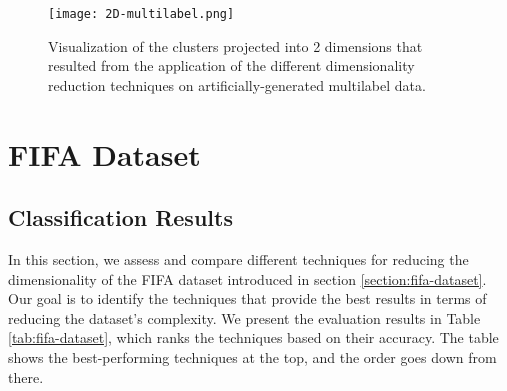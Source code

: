 \begin{figure}
    \centering
    \texttt{[image: 2D-multilabel.png]}
    \caption{Visualization of the clusters projected into 2 dimensions that resulted from the application of the different dimensionality reduction techniques on artificially-generated multilabel data.}
    \label{fig:2D_multilabel}
\end{figure}

\section{FIFA Dataset}\label{section:fifa}

\subsection{Classification Results}

In this section, we assess and compare different techniques for reducing the dimensionality of the FIFA dataset introduced in section \ref{section:fifa-dataset}. Our goal is to identify the techniques that provide the best results in terms of reducing the dataset's complexity. We present the evaluation results in Table \ref{tab:fifa-dataset}, which ranks the techniques based on their accuracy. The table shows the best-performing techniques at the top, and the order goes down from there.

